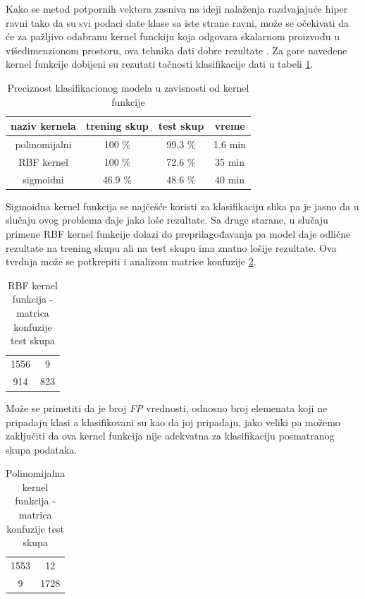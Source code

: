\documentclass[a4paper]{article}
\begin{document}
Kako se metod potpornih vektora zasniva na ideji 
nalaženja razdvajajuće hiper ravni tako da su svi 
podaci date klase sa iste strane ravni, može se 
očekivati da će za pažljivo odabranu kernel 
funckiju koja odgovara skalarnom proizvodu u višedimenzionom prostoru, ova tehnika dati dobre rezultate \cite{classification}. Za gore navedene kernel funkcije dobijeni su rezutati tačnosti klasifikacije dati u tabeli \ref{table:svmtacnost}.

\begin{table}[h!]
\centering
\begin{tabular}{|c c c c|} 
 \hline
  naziv kernela & trening skup & test skup & vreme 
  \\ [0.5ex] 
 \hline
 polinomijalni & 100 \% & 99.3 \% & 1.6 min \\
 RBF kernel & 100 \% & 72.6 \% & 35 min \\
 sigmoidni & 46.9 \% & 48.6 \% & 40 min \\ [1ex] 
 \hline
\end{tabular}
\caption{Preciznost klasifikacionog modela u zavisnosti od kernel funkcije}
\label{table:svmtacnost}
\end{table}

 Sigmoidna kernel funkcija se najčešće koristi za 
 klasifikaciju slika pa je jasno da u slučaju ovog problema daje jako loše rezultate. Sa druge starane, u slučaju primene RBF kernel funkcije
 dolazi do preprilagođavanja pa model daje odlične rezultate na trening skupu ali na test skupu ima 
 znatno lošije rezultate. Ova tvrdnja može se potkrepiti i analizom matrice konfuzije \ref{table:rbf}. 

\begin{table}[h!]
\centering
\begin{tabular}{|c c|}
  \hline
  1556 & 9 \\
  914 & 823  \\
 \hline
\end{tabular}
\caption{RBF kernel funkcija - matrica konfuzije test skupa}
\label{table:rbf}
\end{table}

Može se primetiti da je broj \textit{FP} vrednosti, odnosno broj elemenata koji ne pripadaju klasi a klasifikovani su kao da joj pripadaju, jako veliki pa možemo zaključiti da ova kernel funkcija nije adekvatna za klasifikaciju posmatranog skupa podataka.

\begin{table}[h!]
\centering
\begin{tabular}{|c c|}
  \hline
  1553 & 12 \\
  9 & 1728  \\
 \hline
\end{tabular}
\caption{Polinomijalna kernel funkcija - matrica konfuzije test skupa}
\label{table:poli}
\end{table}
\end{document}

